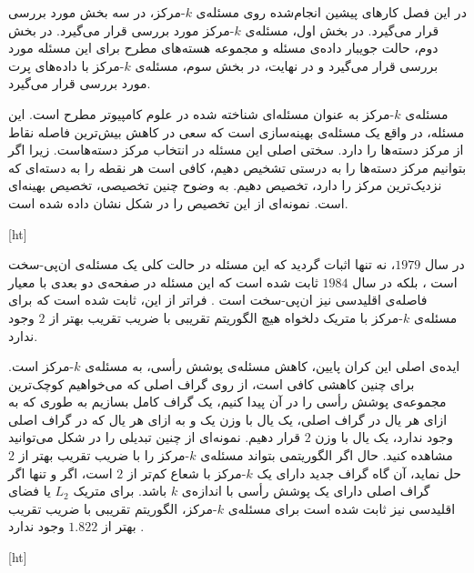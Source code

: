 

در این فصل کارهای پیشین انجام‌شده روی مسئله‌ی $k$-مرکز، در سه بخش مورد بررسی قرار می‌گیرد.
در بخش اول، مسئله‌ی $k$-مرکز مورد بررسی قرار می‌گیرد.
در بخش دوم، حالت جویبار داده‌ی مسئله و مجموعه هسته‌های مطرح برای این مسئله مورد بررسی قرار می‌گیرد و در نهایت، در بخش سوم، مسئله‌ی $k$-مرکز با داده‌های پرت مورد بررسی قرار می‌گیرد.


مسئله‌ی $k$-مرکز به عنوان مسئله‌ای شناخته شده در علوم کامپیوتر مطرح است.
این مسئله، در واقع یک مسئله‌ی بهینه‌سازی است که سعی در کاهش بیش‌ترین فاصله نقاط از مرکز دسته‌ها را دارد.
سختی اصلی این مسئله در انتخاب مرکز دسته‌هاست.
زیرا اگر بتوانیم مرکز دسته‌ها را به درستی تشخیص دهیم، کافی است هر نقطه را به دسته‌ای که نزدیک‌ترین مرکز را دارد، تخصیص دهیم.
به وضوح چنین تخصیصی، تخصیص بهینه‌ای است.
نمونه‌ای از این تخصیص را در شکل  نشان داده شده است.

[ht]

در سال $1979$، نه تنها اثبات گردید که این مسئله در حالت کلی یک مسئله‌ی ان‌پی-سخت است ، بلکه در سال $1984$ ثابت شده است که این مسئله در صفحه‌ی دو بعدی با معیار فاصله‌ی اقلیدسی نیز ان‌پی-سخت است .
فراتر از این، ثابت شده است که برای مسئله‌ی $k$-مرکز با متریک دلخواه هیچ الگوریتم تقریبی با ضریب تقریب بهتر از $2$ وجود ندارد.

ایده‌ی اصلی این کران پایین، کاهش مسئله‌ی پوشش رأسی، به مسئله‌ی $k$-مرکز است.
برای چنین کاهشی کافی است، از روی گراف اصلی که می‌خواهیم کوچک‌ترین مجموعه‌ی پوشش رأسی را در آن پیدا کنیم، یک گراف کامل بسازیم به طوری که به ازای هر یال در گراف اصلی، یک یال با وزن یک و به ازای هر یال که در گراف اصلی وجود ندارد، یک یال با وزن $2$ قرار دهیم.
نمونه‌ای از چنین تبدیلی را در شکل  می‌توانید مشاهده کنید.
حال اگر الگوریتمی بتواند مسئله‌ی $k$-مرکز را با ضریب تقریب بهتر از $2$ حل نماید، آن گاه گراف جدید دارای یک $k$-مرکز با شعاع کم‌تر از $2$ است، اگر و تنها اگر گراف اصلی دارای یک پوشش رأسی با اندازه‌ی $k$ باشد.
برای متریک $L_2$ یا فضای اقلیدسی نیز ثابت شده است برای مسئله‌ی $k$-مرکز، الگوریتم تقریبی با ضریب تقریب بهتر از $1.822$ وجود ندارد .

[ht]

